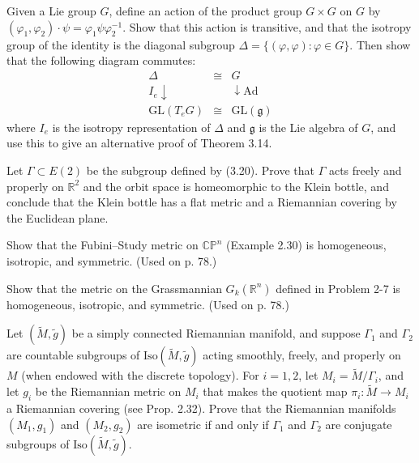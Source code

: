 \begin{exercise}\label{prob:lie-group-adjoint-representation}
Given a Lie group $G$, define an action of the product group $G \times G$ on $G$ by $(\varphi_1,\varphi_2) \cdot \psi = \varphi_1\psi\varphi_2^{-1}$. Show that this action is transitive, and that the isotropy group of the identity is the diagonal subgroup $\Delta = \{(\varphi,\varphi) : \varphi \in G\}$. Then show that the following diagram commutes:
\[\begin{array}{ccc}
\Delta & \cong & G \\
I_e \downarrow & & \downarrow \mathrm{Ad} \\
\mathrm{GL}(T_e G) & \cong & \mathrm{GL}(\mathfrak{g})
\end{array}\]
where $I_e$ is the isotropy representation of $\Delta$ and $\mathfrak{g}$ is the Lie algebra of $G$, and use this to give an alternative proof of Theorem 3.14.
\end{exercise}

\begin{exercise}\label{prob:klein-bottle-flat-covering}
Let $\Gamma \subset E(2)$ be the subgroup defined by (3.20). Prove that $\Gamma$ acts freely and properly on $\mathbb{R}^2$ and the orbit space is homeomorphic to the Klein bottle, and conclude that the Klein bottle has a flat metric and a Riemannian covering by the Euclidean plane.
\end{exercise}

\begin{exercise}\label{prob:fubini-study-metric-homogeneous}
Show that the Fubini--Study metric on $\mathbb{CP}^n$ (Example 2.30) is homogeneous, isotropic, and symmetric. (Used on p. 78.)
\end{exercise}

\begin{exercise}\label{prob:grassmannian-metric-homogeneous}
Show that the metric on the Grassmannian $G_k(\mathbb{R}^n)$ defined in Problem 2-7 is homogeneous, isotropic, and symmetric. (Used on p. 78.)
\end{exercise}

\begin{exercise}\label{prob:riemannian-quotients-conjugate-subgroups}
Let $(\tilde{M},\tilde{g})$ be a simply connected Riemannian manifold, and suppose $\Gamma_1$ and $\Gamma_2$ are countable subgroups of $\mathrm{Iso}(\tilde{M},\tilde{g})$ acting smoothly, freely, and properly on $M$ (when endowed with the discrete topology). For $i = 1,2$, let $M_i = \tilde{M}/\Gamma_i$, and let $g_i$ be the Riemannian metric on $M_i$ that makes the quotient map $\pi_i : \tilde{M} \to M_i$ a Riemannian covering (see Prop. 2.32). Prove that the Riemannian manifolds $(M_1,g_1)$ and $(M_2,g_2)$ are isometric if and only if $\Gamma_1$ and $\Gamma_2$ are conjugate subgroups of $\mathrm{Iso}(\tilde{M},\tilde{g})$.
\end{exercise}

